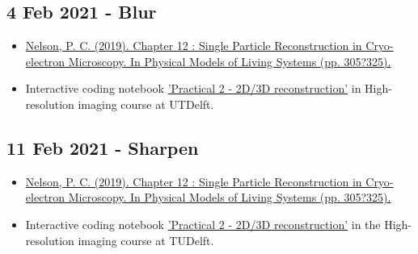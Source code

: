 \documentclass[11pt, oneside]{article}   	%
\begin{document}
\pagebreak
\subsection{4 Feb 2021 - Blur}
\begin{itemize}
	\item \href{https://repository.upenn.edu/cgi/viewcontent.cgi?article=1665&context=physics_papers}{Nelson, P. C. (2019). Chapter 12 : Single Particle Reconstruction in Cryo-electron Microscopy. In Physical Models of Living Systems (pp. 305?325).}
	\item Interactive coding notebook \href{https://gitlab.tudelft.nl/aj-lab/teaching/-/wikis/NB4020}{'Practical 2 - 2D/3D reconstruction'} in High-resolution imaging course at UTDelft.
\end{itemize}

\subsection{11 Feb 2021 - Sharpen}
\begin{itemize}
	\item \href{https://repository.upenn.edu/cgi/viewcontent.cgi?article=1665&context=physics_papers}{Nelson, P. C. (2019). Chapter 12 : Single Particle Reconstruction in Cryo-electron Microscopy. In Physical Models of Living Systems (pp. 305?325).}
	\item Interactive coding notebook \href{https://gitlab.tudelft.nl/aj-lab/teaching/-/wikis/NB4020}{'Practical 2 - 2D/3D reconstruction'} in the High-resolution imaging course at TUDelft.
\end{itemize}
\end{document}
